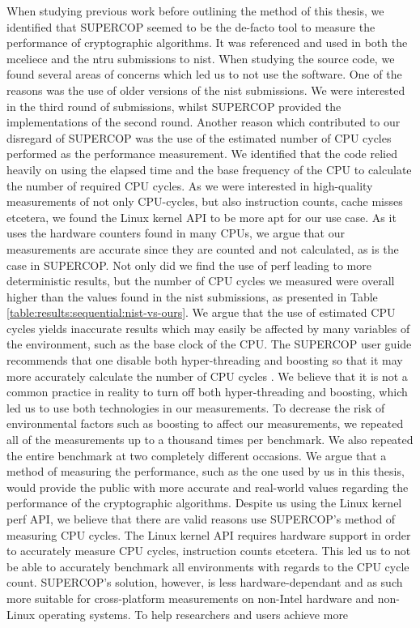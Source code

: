 When studying previous work before outlining the method of this thesis, we identified that SUPERCOP seemed to be the de-facto tool to measure the performance of cryptographic algorithms. It was referenced and used in both the \gls{mceliece} \cite{mceliece2020} and the \gls{ntru} \cite{ntru2020} submissions to \gls{nist}. When studying the source code, we found several areas of concerns which led us to not use the software. One of the reasons was the use of older versions of the \gls{nist} submissions. We were interested in the third round of submissions, whilst SUPERCOP provided the implementations of the second round. Another reason which contributed to our disregard of SUPERCOP was the use of the estimated number of CPU cycles performed as the performance measurement. We identified that the code relied heavily on using the elapsed time and the base frequency of the CPU to calculate the number of required CPU cycles. As we were interested in high-quality measurements of not only CPU-cycles, but also instruction counts, cache misses etcetera, we found the Linux kernel API to be more apt for our use case. As it uses the hardware counters found in many CPUs, we argue that our measurements are accurate since they are counted and not calculated, as is the case in SUPERCOP. Not only did we find the use of perf leading to more deterministic results, but the number of CPU cycles we measured were overall higher than the values found in the \gls{nist} submissions, as presented in Table \ref{table:results:sequential:nist-vs-ours}. We argue that the use of estimated CPU cycles yields inaccurate results which may easily be affected by many variables of the environment, such as the base clock of the CPU. The SUPERCOP user guide recommends that one disable both hyper-threading and boosting so that it may more accurately calculate the number of CPU cycles \cite{supercop}. We believe that it is not a common practice in reality to turn off both hyper-threading and boosting, which led us to use both technologies in our measurements. To decrease the risk of environmental factors such as boosting to affect our measurements, we repeated all of the measurements up to a thousand times per benchmark. We also repeated the entire benchmark at two completely different occasions. We argue that a method of measuring the performance, such as the one used by us in this thesis, would provide the public with more accurate and real-world values regarding the performance of the cryptographic algorithms. Despite us using the Linux kernel perf API, we believe that there are valid reasons use SUPERCOP's method of measuring CPU cycles. The Linux kernel API requires hardware support in order to accurately measure CPU cycles, instruction counts etcetera. This led us to not be able to accurately benchmark all environments with regards to the CPU cycle count. SUPERCOP's solution, however, is less hardware-dependant and as such more suitable for cross-platform measurements on non-Intel hardware and non-Linux operating systems. To help researchers and users achieve more 